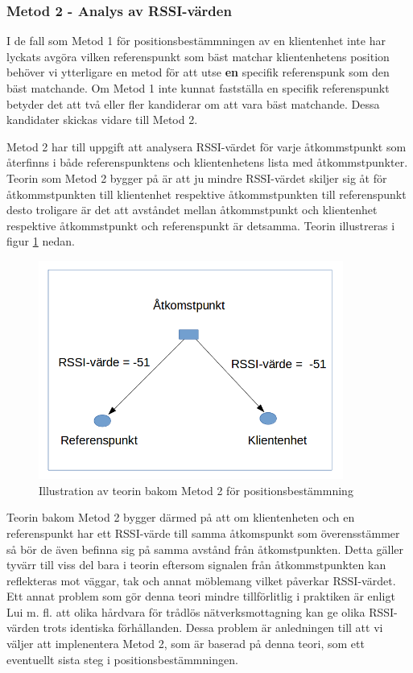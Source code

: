 \documentclass[swedish, a4paper,12pt]{article}
\begin{document}
\subsubsection{Metod 2 - Analys av RSSI-värden}

I de fall som Metod 1 för positionsbestämmningen av en klientenhet inte har lyckats avgöra vilken referenspunkt som bäst matchar klientenhetens position behöver vi ytterligare en metod för att utse \textbf{en} specifik referenspunk som den bäst matchande. Om Metod 1 inte kunnat fastställa en specifik referenspunkt betyder det att två eller fler kandiderar om att vara bäst matchande. Dessa kandidater skickas vidare till Metod 2.

Metod 2 har till uppgift att analysera RSSI-värdet för varje åtkommstpunkt som återfinns i både referenspunktens och klientenhetens lista med åtkommstpunkter.
Teorin som Metod 2 bygger på är att ju mindre RSSI-värdet skiljer sig åt för åtkommstpunkten till klientenhet respektive åtkommstpunkten till referenspunkt desto troligare är det att avståndet mellan åtkommstpunkt och klientenhet respektive åtkommstpunkt och referenspunkt är detsamma. Teorin illustreras i figur \ref{fig:TEO2} nedan.

\begin{figure}[H]
  \centering
  \includegraphics[width=10cm]{media/TeoriMetod2.png}
  \caption{Illustration av teorin bakom Metod 2 för positionsbestämmning}
  \label{fig:TEO2}
\end{figure}

Teorin bakom Metod 2 bygger därmed på att om klientenheten och en referenspunkt har ett RSSI-värde till samma åtkomspunkt som överensstämmer så bör de även befinna sig på samma avstånd från åtkomstpunkten. Detta gäller tyvärr till viss del bara i teorin eftersom signalen från åtkommstpunkten kan reflekteras mot väggar, tak och annat möblemang vilket påverkar RSSI-värdet\cite{zanca2008experimental}. Ett annat problem som gör denna teori mindre tillförlitlig i praktiken är enligt Lui m. fl. att olika hårdvara för trådlös nätverksmottagning kan ge olika RSSI-värden trots identiska förhållanden\cite{problem_with_RSSI}. Dessa problem är anledningen till att vi väljer att implenentera Metod 2, som är baserad på denna teori, som ett eventuellt sista steg i positionsbestämmningen.
\end{document}
